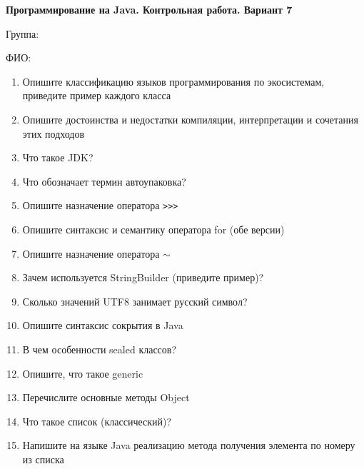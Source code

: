\documentclass[12pt]{article}
\begin{document}
\newpage\begin{minipage}{\textwidth}
\textbf{Программирование на Java. Контрольная работа. Вариант 7}

Группа: \underline{\hspace{3cm}}

ФИО: \underline{\hspace{10cm}}

\begin{enumerate}
\item Опишите классификацию языков программирования по экосистемам, приведите пример каждого класса
\item Опишите достоинства и недостатки компиляции, интерпретации и сочетания этих подходов
\item Что такое JDK?
\item Что обозначает термин автоупаковка?
\item Опишите назначение оператора \verb|>>>|
\item Опишите синтаксис и семантику оператора for (обе версии)
\item Опишите назначение оператора $\sim$
\item Зачем используется StringBuilder (приведите пример)?
\item Сколько значений UTF8 занимает русский символ?
\item Опишите синтаксис сокрытия в Java
\item В чем особенности sealed классов?
\item Опишите, что такое generic
\item Перечислите основные методы Object
\item Что такое список (классический)?
\item Напишите на языке Java реализацию метода получения элемента по номеру из списка

\end{enumerate}
\end{minipage}
\end{document}
